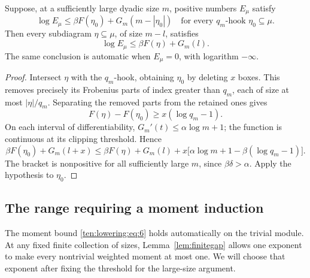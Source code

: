 \begin{lemma}\label{s:lowering-inherited-hook}
Suppose, at a sufficiently large dyadic size $m$, positive numbers
$E_\mu$ satisfy
\begin{equation}
 \log E_\mu\le \beta F(\eta_0)+G_m(m-|\eta_0|)
 \quad\text{for every $q_m$-hook $\eta_0\subseteq\mu$.}
 \label{ten:lowering:eq:4}
\end{equation}
Then every subdiagram $\eta\subseteq\mu$, of size $m-l$, satisfies
\begin{equation}
                 \log E_\mu\le\beta F(\eta)+G_m(l).
                                                                  \label{ten:lowering:eq:5}
\end{equation}
The same conclusion is automatic when $E_\mu=0$, with logarithm
$-\infty$.
\end{lemma}
\begin{proof}
Intersect $\eta$ with the $q_m$-hook, obtaining $\eta_0$ by deleting
$x$ boxes. This removes precisely its Frobenius parts of index
greater than $q_m$, each of size at most $|\eta|/q_m$.
Separating the removed parts from the retained ones gives
\[
 F(\eta)-F(\eta_0)\ge x(\log q_m-1).
\]
On each interval of differentiability, $G_m'(t)\le\alpha\log m+1$;
the function is continuous at its clipping threshold. Hence
\[
 \beta F(\eta_0)+G_m(l+x)
 \le \beta F(\eta)+G_m(l)
       +x\bigl[\alpha\log m+1-\beta(\log q_m-1)\bigr].
\]
The bracket is nonpositive for all sufficiently large $m$, since
$\beta\delta>\alpha$. Apply the hypothesis to $\eta_0$.
\end{proof}

\subsection{The range requiring a moment induction}

The moment bound \eqref{ten:lowering:eq:6} holds automatically on
the trivial module. At any fixed finite collection of sizes,
Lemma~\ref{lem:finitegap} allows one exponent to make every
nontrivial weighted moment at most one. We will choose that
exponent after fixing the threshold for the large-size argument.

